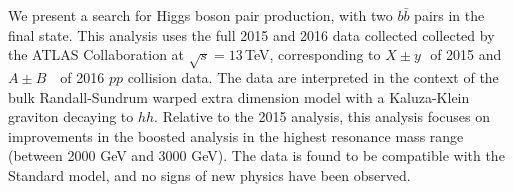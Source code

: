 We present a search for Higgs boson pair production, with two $b\bar{b}$ pairs in the final state. This analysis uses the full 2015 and 2016 data collected collected by the ATLAS Collaboration at $\sqrt{s}=13$\,TeV, corresponding to $X \pm y$\,\ifb\ of 2015 and $A \pm B$\, \ifb\ of 2016 $pp$ collision data. The data are interpreted in the context of the bulk Randall-Sundrum warped extra dimension model with a Kaluza-Klein graviton decaying to $hh$. %
Relative to the 2015 analysis, this analysis focuses on improvements in the boosted analysis in the highest resonance mass range (between 2000 GeV and 3000 GeV). The data is found to be compatible with the Standard model, and no signs of new physics have been observed.  